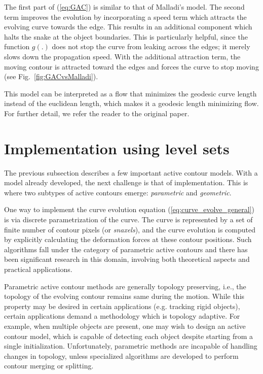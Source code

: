 The first part of (\ref{eq:GAC}) is similar to that of Malladi's model. The second term improves the evolution by incorporating a speed term which attracts the evolving curve towards the edge. This results in an additional component which halts the snake at the object boundaries. This is particularly helpful, since the function $g(.)$ does not stop the curve from leaking across the edges; it merely slows down the propagation speed. With the additional attraction term, the moving contour is attracted toward the edges and forces the curve to stop moving (see Fig.~\ref{fig:GACvsMalladi}).

 
This model can be interpreted as a flow that minimizes the geodesic curve length instead of the euclidean length, which makes it a geodesic length minimizing flow. For further detail, we refer the reader to the original paper\cite{caselles_GAC}.

\section{Implementation using level sets}
The previous subsection describes a few important active contour models. With a model already developed, the next challenge is that of implementation. This is where two subtypes of active contours emerge: \textit{parametric} and \textit{geometric}.

One way to implement the curve evolution equation (\ref{eq:curve_evolve_general}) is via discrete parametrization of the curve. The curve is represented by a set of finite number of contour pixels (or \textit{snaxels}), and the curve evolution is computed by explicitly calculating the deformation forces at these contour positions. Such algorithms fall under the category of parametric active contours and there has been significant research in this domain, involving both theoretical aspects
\cite{kwt_snakes,li_VFC,xu_GVF_journal,li_PIG,jacob2004efficient,bspline_snake,mishra2011decoupled} and practical applications\cite{leucocyte_dipti,ray2003merging,ray2002tracking,lesage2009review,zhu2014complete}. 

Parametric active contour methods are generally topology preserving, i.e., the topology of the evolving contour remains same during the motion. While this property may be desired in certain applications (e.g. tracking rigid objects), certain applications demand a methodology which is topology adaptive. For example, when multiple objects are present, one may wish to design an active contour model, which is capable of detecting each object despite starting from a single initialization. Unfortunately, parametric methods are incapable of handling changes in topology, unless specialized algorithms are developed to perform contour merging or splitting.

